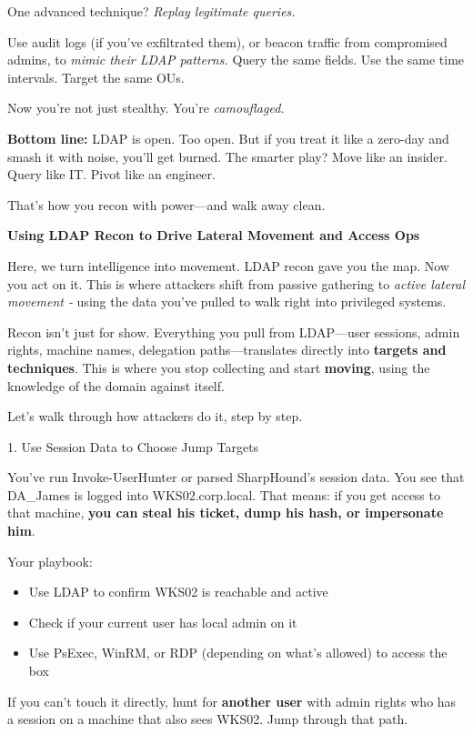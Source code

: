 One advanced technique? \textit{Replay legitimate queries.}

Use audit logs (if you’ve exfiltrated them), or beacon traffic from compromised admins, to \textit{mimic their LDAP patterns.} Query the same fields. Use the same time intervals. Target the same OUs.

Now you’re not just stealthy. You’re \textit{camouflaged.}

\textbf{Bottom line:} LDAP is open. Too open. But if you treat it like a zero-day and smash it with noise, you’ll get burned. The smarter play? Move like an insider. Query like IT. Pivot like an engineer.

That’s how you recon with power—and walk away clean.

\textbf{Using LDAP Recon to Drive Lateral Movement and Access Ops}

Here, we turn intelligence into movement. LDAP recon gave you the map. Now you act on it. This is where attackers shift from passive gathering to \textit{active lateral movement - }using the data you’ve pulled to walk right into privileged systems.

Recon isn’t just for show. Everything you pull from LDAP—user sessions, admin rights, machine names, delegation paths—translates directly into \textbf{targets and techniques}. This is where you stop collecting and start \textbf{moving}, using the knowledge of the domain against itself.

Let’s walk through how attackers do it, step by step.

 1. Use Session Data to Choose Jump Targets

You’ve run Invoke-UserHunter or parsed SharpHound’s session data. You see that DA\_James is logged into WKS02.corp.local. That means: if you get access to that machine, \textbf{you can steal his ticket, dump his hash, or impersonate him}.

Your playbook:

\begin{itemize}
    \item Use LDAP to confirm WKS02 is reachable and active

    \item Check if your current user has local admin on it

    \item Use PsExec, WinRM, or RDP (depending on what’s allowed) to access the box

\end{itemize}
If you can’t touch it directly, hunt for \textbf{another user} with admin rights who has a session on a machine that also sees WKS02. Jump through that path.

